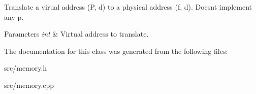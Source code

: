 Translate a virual address (P, d) to a physical address (f, d). Doesn\textquotesingle{}t implement any p. 


\begin{DoxyParams}{Parameters}
{\em int} & Virtual address to translate. \\
\hline
\end{DoxyParams}


The documentation for this class was generated from the following files\+:\begin{DoxyCompactItemize}
\item 
src/memory.\+h\item 
src/memory.\+cpp\end{DoxyCompactItemize}
